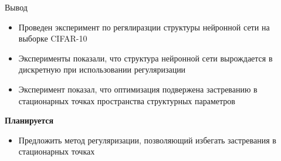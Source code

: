 \documentclass[10pt]{beamer}
\begin{document}





\begin{frame}{Вывод}

\begin{itemize}
	\item Проведен эксперимент по регялиразции структуры нейронной сети на выборке CIFAR-10
	\item Эксперименты показали, что структура нейронной сети вырождается в дискретную при использовании регуляризации
	\item Эксперимент показал, что оптимизация подвержена застреванию в стационарных точках пространства структурных параметров
\end{itemize}

{\bf Планируется}\\
	\begin{itemize}
		\item Предложить метод регуляризации, позволяющий избегать застревания в стационарных точках
	\end{itemize}

\end{frame}
\end{document}
